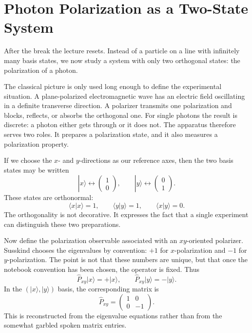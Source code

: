 \section{Photon Polarization as a Two-State System}

After the break the lecture resets. Instead of a particle on a line with infinitely many basis states, we now study a system with only two orthogonal states: the polarization of a photon.

The classical picture is only used long enough to define the experimental situation. A plane-polarized electromagnetic wave has an electric field oscillating in a definite transverse direction. A polarizer transmits one polarization and blocks, reflects, or absorbs the orthogonal one. For single photons the result is discrete: a photon either gets through or it does not. The apparatus therefore serves two roles. It prepares a polarization state, and it also measures a polarization property.

If we choose the \(x\)- and \(y\)-directions as our reference axes, then the two basis states may be written
\begin{equation}
|x\rangle \leftrightarrow
\begin{pmatrix}
1\\
0
\end{pmatrix},
\qquad
|y\rangle \leftrightarrow
\begin{pmatrix}
0\\
1
\end{pmatrix}.
\end{equation}
These states are orthonormal:
\begin{equation}
\langle x|x\rangle=1,
\qquad
\langle y|y\rangle=1,
\qquad
\langle x|y\rangle=0.
\end{equation}
The orthogonality is not decorative. It expresses the fact that a single experiment can distinguish these two preparations.

Now define the polarization observable associated with an \(xy\)-oriented polarizer. Susskind chooses the eigenvalues by convention: \(+1\) for \(x\)-polarization and \(-1\) for \(y\)-polarization. The point is not that these numbers are unique, but that once the notebook convention has been chosen, the operator is fixed. Thus
\begin{equation}
\hat P_{xy}|x\rangle=+|x\rangle,
\qquad
\hat P_{xy}|y\rangle=-|y\rangle.
\end{equation}
In the \((|x\rangle,|y\rangle)\) basis, the corresponding matrix is
\begin{equation}
\hat P_{xy}=
\begin{pmatrix}
1 & 0\\
0 & -1
\end{pmatrix}.
\end{equation}
This is reconstructed from the eigenvalue equations rather than from the somewhat garbled spoken matrix entries.

